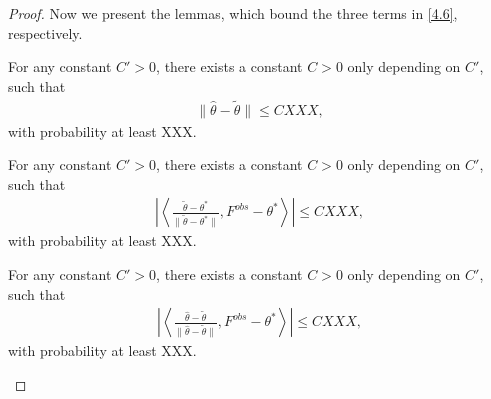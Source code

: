 \begin{proof}
Now we present the lemmas, which bound the three terms in \eqref{4.6}, respectively. 
\begin{lemma}
For any constant $C'>0$, there exists a constant $C>0$ only depending on $C'$, such that
\begin{align*}
\|\hat \theta - \tilde{\theta} \| \leq C XXX,
\end{align*}
with probability at least XXX.
\end{lemma}


\begin{lemma}
For any constant $C'>0$, there exists a constant $C>0$ only depending on $C'$, such that
\begin{align*}
\left| \left\langle \frac{\tilde \theta -  \theta^*}{\| \tilde \theta - \theta^* \|}, F^{obs} - \theta^* \right\rangle \right|
 \leq C XXX,
\end{align*}
with probability at least XXX.
\end{lemma}


\begin{lemma}
For any constant $C'>0$, there exists a constant $C>0$ only depending on $C'$, such that
\begin{align*}
\left| \left\langle \frac{\hat \theta - \tilde \theta}{\| \hat \theta - \tilde \theta \|}, F^{obs} - \theta^* \right\rangle \right|
 \leq C XXX,
\end{align*}
with probability at least XXX.
\end{lemma}

\end{proof}

		
